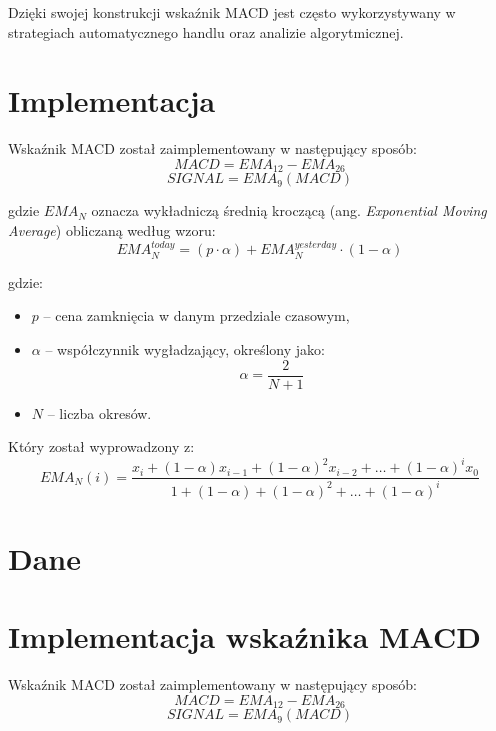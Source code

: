 \documentclass[12pt, letterpaper]{article}
\begin{document}
\bigskip
Dzięki swojej konstrukcji wskaźnik MACD jest często wykorzystywany w strategiach automatycznego handlu oraz analizie algorytmicznej.

\section{Implementacja}

Wskaźnik MACD został zaimplementowany w następujący sposób:
\begin{equation}
    MACD = EMA_{12} - EMA_{26}
\end{equation}
\begin{equation}
    SIGNAL = EMA_9(MACD)
\end{equation}

gdzie $EMA_N$ oznacza wykładniczą średnią kroczącą (ang. \textit{Exponential Moving Average}) obliczaną według wzoru:
\begin{equation}
    EMA_N^{today} = (p \cdot \alpha) + EMA_N^{yesterday} \cdot (1 - \alpha)
\end{equation}

gdzie:
\begin{itemize}
    \item $p$ – cena zamknięcia w danym przedziale czasowym,
    \item $\alpha$ – współczynnik wygładzający, określony jako:
    \begin{equation}
        \alpha = \frac{2}{N+1}
    \end{equation}
    \item $N$ – liczba okresów.
\end{itemize}

Który został wyprowadzony z:
\begin{equation}
    EMA_N(i) = \frac{x_i + (1 - \alpha)x_{i-1} + (1 - \alpha)^2 x_{i-2} + \dots + (1 - \alpha)^i x_0}
    {1 + (1 - \alpha) + (1 - \alpha)^2 + \dots + (1 - \alpha)^i}
\end{equation}

\section{Dane}

\section{Implementacja wskaźnika MACD}

Wskaźnik MACD został zaimplementowany w następujący sposób:
\begin{equation}
    MACD = EMA_{12} - EMA_{26}
\end{equation}
\begin{equation}
    SIGNAL = EMA_9(MACD)
\end{equation}
\end{document}
